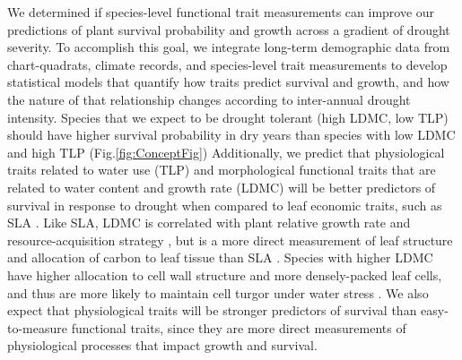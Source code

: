 \documentclass[12pt, letterpaper]{article}
\begin{document}
We determined if species-level functional trait measurements can improve our predictions of plant survival probability and growth across a gradient of drought severity. To accomplish this goal, we integrate long-term demographic data from chart-quadrats, climate records, and species-level trait measurements to develop statistical models that quantify how traits predict survival and growth, and how the nature of that relationship changes according to inter-annual drought intensity. 
Species that we expect to be drought tolerant (high LDMC, low TLP) should have higher survival probability in dry years than species with low LDMC and high TLP (Fig.\ref{fig:ConceptFig}) Additionally, we predict that physiological traits related to water use (TLP) and morphological functional traits that are related to water content and growth rate (LDMC) will be better predictors of survival in response to drought when compared to leaf economic traits,  such as SLA \citep{Wright2004, Reich2014}. Like SLA, LDMC is correlated with plant relative growth rate and resource-acquisition strategy \citep{Weiher1999ChallengingEcology}, but is a more direct measurement of leaf structure and allocation of carbon to leaf tissue than SLA \citep{Niinemets1999ComponentsPlants,Hodgson2011}. Species with higher LDMC have higher allocation to cell wall structure and more densely-packed leaf cells, and thus are more likely to maintain cell turgor under water stress \citep{Niinemets2001Global-scaleShrubs,Poorter2009CausesMeta-analysis,Wilcox2020PlantPrairie}.%
We also expect that physiological traits will be stronger predictors of survival than easy-to-measure functional traits, since they are more direct measurements of physiological processes that impact growth and survival. 
\end{document}

